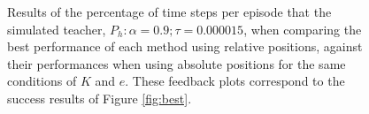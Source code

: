  \begin{figure}[H]
  \centering
   \hfill
  \hfill
  \caption{Results of the percentage of time steps per episode that the simulated teacher, $P_h: \alpha = 0.9; \tau =  0.000015$, when comparing the best performance of each method using relative positions, against their performances when using absolute positions for the
same conditions of $K$ and $e$. These feedback plots correspond to the success results of Figure \ref{fig:best}.}
  \label{fig:best-feedback}
\end{figure}
